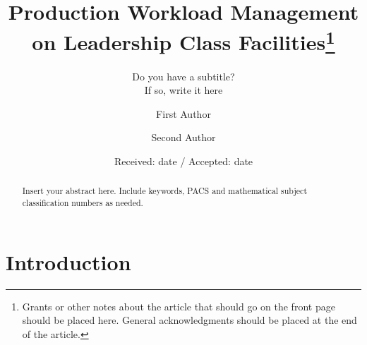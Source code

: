 \documentclass[smallextended]{svjour3}      %
\begin{document}
\title{Production Workload Management on Leadership Class Facilities\thanks{Grants or other notes about the article that should go on the front page should be
placed here. General acknowledgments should be placed at the end of the article.}
}
\subtitle{Do you have a subtitle?\\ If so, write it here}


\author{First Author         \and
        Second Author %
}



\date{Received: date / Accepted: date}

\maketitle


\begin{abstract}
Insert your abstract here. Include keywords, PACS and mathematical
subject classification numbers as needed.
\end{abstract}



\section{Introduction}
\label{sec:introduction}

\end{document}
